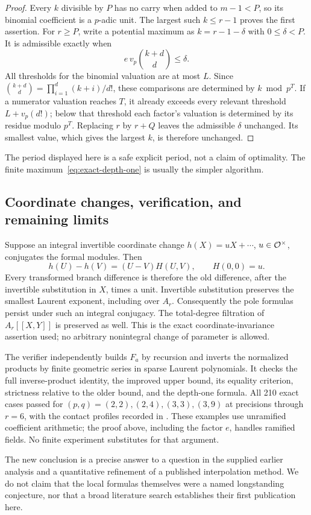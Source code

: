 \begin{proof}
Every $k$ divisible by $P$ has no carry when added to $m-1<P$, so its binomial coefficient is a $p$-adic unit. The largest such $k\le r-1$ proves the first assertion.
For $r\ge P$, write a potential maximum as $k=r-1-\delta$ with $0\le\delta<P$. It is admissible exactly when
\[
 e\,v_p\binom{k+d}{d}\le\delta.
\]
All thresholds for the binomial valuation are at most $L$. Since
$\binom{k+d}{d}=\prod_{i=1}^d(k+i)/d!$, these comparisons are determined by $k\bmod p^T$. If a numerator valuation reaches $T$, it already exceeds every relevant threshold $L+v_p(d!)$; below that threshold each factor's valuation is determined by its residue modulo $p^T$. Replacing $r$ by $r+Q$ leaves the admissible $\delta$ unchanged. Its smallest value, which gives the largest $k$, is therefore unchanged.
\end{proof}

The period displayed here is a safe explicit period, not a claim of optimality. The finite maximum~\eqref{eq:exact-depth-one} is usually the simpler algorithm.

\subsection{Coordinate changes, verification, and remaining limits}

Suppose an integral invertible coordinate change $h(X)=uX+\cdots$, $u\in\mathcal O^\times$, conjugates the formal modules. Then
\[
 h(U)-h(V)=(U-V)H(U,V),\qquad H(0,0)=u.
\]
Every transformed branch difference is therefore the old difference, after the invertible substitution in $X$, times a unit. Invertible substitution preserves the smallest Laurent exponent, including over $A_r$. Consequently the pole formulas persist under such an integral conjugacy. The total-degree filtration of $A_r[[X,Y]]$ is preserved as well. This is the exact coordinate-invariance assertion used; no arbitrary nonintegral change of parameter is allowed.

The verifier  independently builds $F_a$ by recursion and inverts the normalized products by finite geometric series in sparse Laurent polynomials. It checks the full inverse-product identity, the improved upper bound, its equality criterion, strictness relative to the older bound, and the depth-one formula. All 210 exact cases passed for $(p,q)=(2,2),(2,4),(3,3),(3,9)$ at precisions through $r=6$, with the contact profiles recorded in . These examples use unramified coefficient arithmetic; the proof above, including the factor $e$, handles ramified fields. No finite experiment substitutes for that argument.

The new conclusion is a precise answer to a question in the supplied earlier analysis and a quantitative refinement of a published interpolation method. We do not claim that the local formulas themselves were a named longstanding conjecture, nor that a broad literature search establishes their first publication here.
